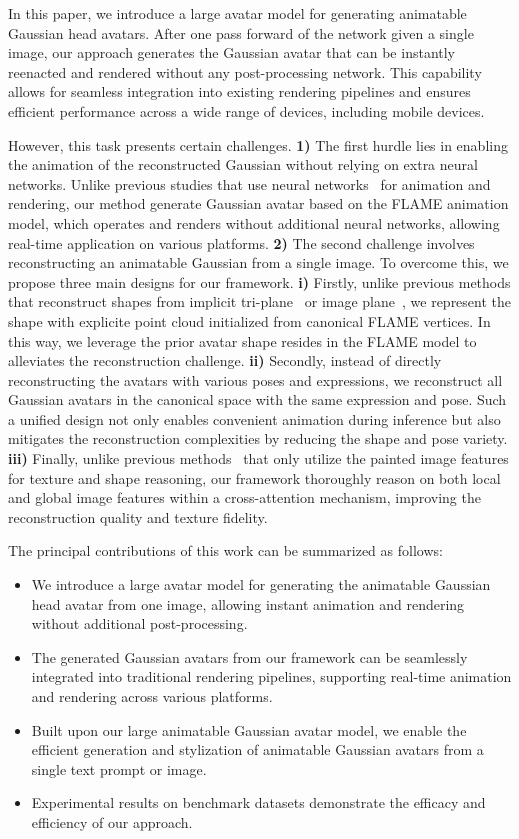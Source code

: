 In this paper, we introduce a large avatar model for generating animatable Gaussian head avatars. After one pass forward of the network given a single image, our approach generates the Gaussian avatar that can be instantly reenacted and rendered without any post-processing network. This capability allows for seamless integration into existing rendering pipelines and ensures efficient performance across a wide range of devices, including mobile devices. 

However, this task presents certain challenges. 
\textbf{1)} The first hurdle lies in enabling the animation of the reconstructed Gaussian without relying on extra neural networks. Unlike previous studies that use neural networks~\cite{GAGAvatar} for animation and rendering, our method generate Gaussian avatar based on the FLAME animation model, which operates and renders without additional neural networks, allowing real-time application on various platforms.
\textbf{2)} The second challenge involves reconstructing an animatable Gaussian from a single image. To overcome this, we propose three main designs for our framework. 
\textbf{i)} Firstly, unlike previous methods that reconstruct shapes from implicit tri-plane~\cite{LGM} or image plane~\cite{GAGAvatar}, we represent the shape with explicite point cloud initialized from canonical FLAME vertices. In this way, we leverage the prior avatar shape resides in the FLAME model to alleviates the reconstruction challenge. 
\textbf{ii)} Secondly, instead of directly reconstructing the avatars with various poses and expressions, we reconstruct all Gaussian avatars in the canonical space with the same expression and pose. Such a unified design not only enables convenient animation during inference but also mitigates the reconstruction complexities by reducing the shape and pose variety. 
\textbf{iii)} Finally, unlike previous methods~\cite{transhuman} that only utilize the painted image features for texture and shape reasoning, our framework thoroughly reason on both local and global image features within a cross-attention mechanism, improving the reconstruction quality and texture fidelity. 

The principal contributions of this work can be summarized as follows:

\begin{itemize}[leftmargin=*]
\item We introduce a large avatar model for generating the animatable Gaussian head avatar from one image, allowing instant animation and rendering without additional post-processing.
\item The generated Gaussian avatars from our framework can be seamlessly integrated into traditional rendering pipelines, supporting real-time animation and rendering across various platforms.
\item Built upon our large animatable Gaussian avatar model, we enable the efficient generation and stylization of animatable Gaussian avatars from a single text prompt or image.
\item Experimental results on benchmark datasets demonstrate the efficacy and efficiency of our approach.
\end{itemize}